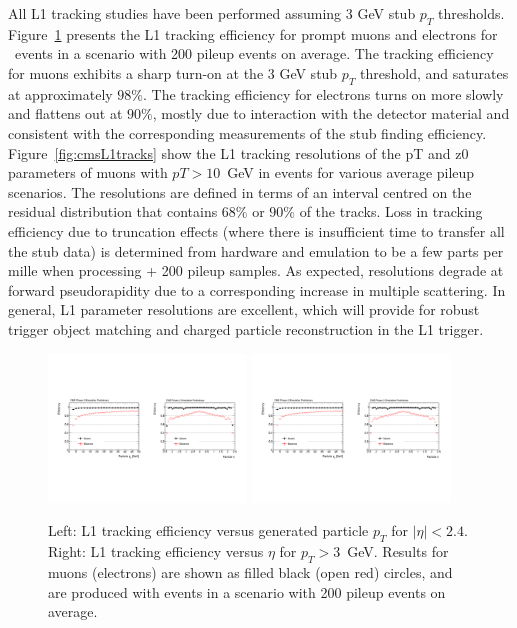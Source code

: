 All L1 tracking studies have been performed assuming 3 GeV stub $p_T$ thresholds.
Figure~\ref{fig:cmsL1lepton} presents the L1 tracking efficiency for prompt muons and electrons for \ttbar~events in a scenario with 200 pileup events on average. 
The tracking efficiency for muons exhibits a sharp turn-on at the 3 GeV stub $p_T$ threshold, and saturates at approximately $98\%$. 
The tracking efficiency for electrons turns on more slowly and flattens out at $90\%$, mostly due to interaction with the detector material and consistent with the corresponding measurements of the stub finding efficiency. 
Figure~\ref{fig:cmsL1tracks} show the L1 tracking resolutions of the pT and z0 parameters of muons with $pT>10$~GeV in \ttbar events for various average pileup scenarios. The resolutions are defined in terms of an interval
centred on the residual distribution that contains $68\%$ or $90\%$ of the tracks.
Loss in tracking efficiency due to truncation effects (where there is insufficient time to transfer all the stub data) is determined from hardware and emulation to be a few parts per mille when processing \ttbar + 200 pileup samples.
As expected, resolutions degrade at forward pseudorapidity due to a corresponding increase in multiple scattering. 
In general, L1 parameter resolutions are excellent, which will provide for robust trigger object matching and charged particle reconstruction in the L1 trigger.

\begin{figure}[h!tbp]
\begin{center}
  \includegraphics[width=0.47\textwidth]{figures/cmsupgrade/TDR-17-001_fig6_6_a.pdf} \hfill
  \includegraphics[width=0.47\textwidth]{figures/cmsupgrade/TDR-17-001_fig6_6_b.pdf}
  \caption{ Left: L1 tracking efficiency versus generated particle $p_T$ for $|\eta| < 2.4$.
	Right: L1 tracking efficiency versus $\eta$ for $p_T > 3$~GeV. Results for muons (electrons) are shown as filled black (open red) circles, and are produced with \ttbar events in a scenario with 200 pileup events on average. }
  \label{fig:cmsL1lepton}
\end{center}
\end{figure}

